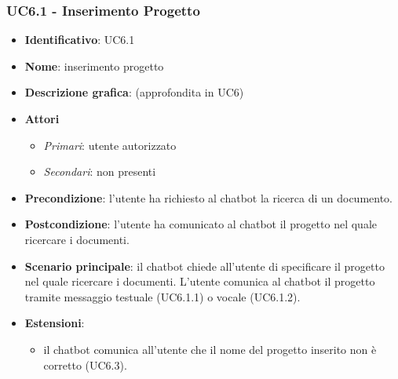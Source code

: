 \subsubsection{UC6.1 - Inserimento Progetto}
\begin{itemize}
    \item \textbf{Identificativo}: UC6.1
    \item \textbf{Nome}: inserimento progetto
    \item \textbf{Descrizione grafica}: (approfondita in UC6)
    \item \textbf{Attori}
 \begin{itemize} 
    \item \textit{Primari}: utente autorizzato
    \item \textit{Secondari}: non presenti
 \end{itemize}
 \item \textbf{Precondizione}: l'utente ha richiesto al chatbot la ricerca di un documento.
 \item \textbf{Postcondizione}:  l'utente ha comunicato al chatbot il progetto nel quale ricercare i documenti.
 \item \textbf{Scenario principale}: il chatbot chiede all'utente di specificare il progetto nel quale ricercare i documenti. L'utente comunica al chatbot il progetto tramite messaggio testuale (UC6.1.1) o vocale (UC6.1.2).
 \item \textbf{Estensioni}: 
 \begin{itemize} 
    \item il chatbot comunica all'utente che il nome del progetto inserito non è corretto (UC6.3).
 \end{itemize}
\end{itemize}

